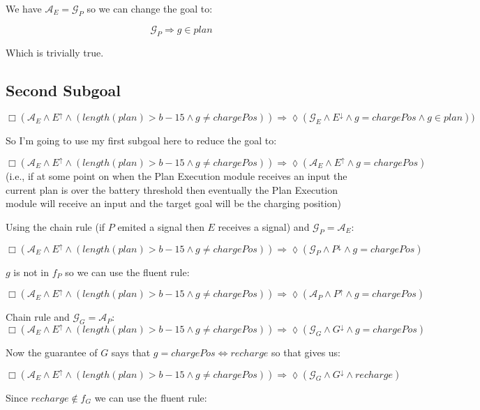 \documentclass{blue-book}
\let\sometime=\lozenge
\let\always=\Box
\begin{document}
We have $\mathcal{A}_E = \mathcal{G}_P$ so we can change the goal to:

$$\mathcal{G}_P \Rightarrow g \in plan$$

Which is trivially true.  

 \subsection{Second Subgoal}
 $$\always (\mathcal{A}_E \land E^{\uparrow} \land  (length(plan) > b - 15 \land g \neq chargePos)) \Rightarrow \sometime (\mathcal{G}_E \land E^{\downarrow} \land g = chargePos \land  g \in plan))$$
 
 So I'm going to use my first subgoal here to reduce the goal to:
 
 $$\always (\mathcal{A}_E \land E^{\uparrow} \land  (length(plan) > b - 15 \land g \neq chargePos)) \Rightarrow \sometime  (\mathcal{A}_E \land E^{\uparrow} \land g = chargePos)$$
 (i.e., if at some point on when the Plan Execution module receives an input the current plan is over the battery threshold then eventually  the Plan Execution module will receive an input and the target goal will be the charging position)
 
 Using the chain rule (if $P$ emited a signal then $E$ receives a signal) and $\mathcal{G}_P = \mathcal{A}_E$:
 
 $$\always (\mathcal{A}_E \land E^{\uparrow} \land  (length(plan) > b - 15 \land g \neq chargePos)) \Rightarrow \sometime (\mathcal{G}_P \land P^{\downarrow} \land g = chargePos)$$

$g$ is not in $f_P$ so we can use the fluent rule:

$$\always (\mathcal{A}_E \land E^{\uparrow} \land  (length(plan) > b - 15 \land g \neq chargePos)) \Rightarrow \sometime  (\mathcal{A}_P \land P^{\uparrow} \land g = chargePos)$$


Chain rule and $\mathcal{G}_G = \mathcal{A}_P$:
$$\always (\mathcal{A}_E \land E^{\uparrow} \land  (length(plan) > b - 15 \land g \neq chargePos)) \Rightarrow \sometime  (\mathcal{G}_G \land G^{\downarrow} \land  g = chargePos)$$

Now the guarantee of $G$ says that $g = chargePos \iff recharge$ so that gives us:

$$\always (\mathcal{A}_E \land E^{\uparrow} \land  (length(plan) > b - 15 \land g \neq chargePos)) \Rightarrow \sometime  (\mathcal{G}_G \land G^{\downarrow} \land  recharge)$$

Since $recharge \not\in f_G$ we can use the fluent rule:
\end{document}

